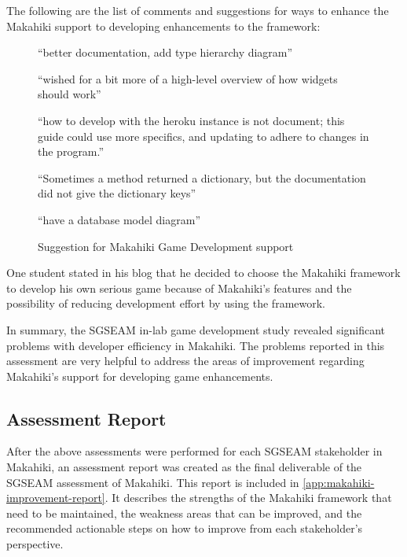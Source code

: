 The following are the list of comments and suggestions for ways to enhance the Makahiki support to developing enhancements to the framework:

\begin{figure}[ht!]
\begin{mybox}
\begin{compactenum}
	\item ``better documentation, add type hierarchy diagram''
	\item ``wished for a bit more of a high-level overview of how widgets should work''
	\item ``how to develop with the heroku instance is not document; this guide could use more specifics, and updating to adhere to changes in the program.''
	\item ``Sometimes a method returned a dictionary, but the documentation did not give the dictionary keys''
	\item ``have a database model diagram''
\end{compactenum}
\end{mybox}
\caption{Suggestion for Makahiki Game Development support}
\label{fig:develop-suggestion}  
\end{figure}

One student stated in his blog that he decided to choose the Makahiki
framework to develop his own serious game because of Makahiki's features and the possibility
of reducing development effort by using the framework. 

In summary, the SGSEAM in-lab game development study revealed significant problems with developer efficiency in Makahiki. The problems reported in this assessment are very helpful to address the areas of improvement regarding Makahiki's support for developing game enhancements.

\subsection{Assessment Report}

After the above assessments were performed for each SGSEAM stakeholder in Makahiki, an assessment report was created as the final deliverable of the SGSEAM assessment of Makahiki. This report is included in \autoref{app:makahiki-improvement-report}. It  describes the strengths of the Makahiki framework that need to be maintained, the weakness areas that can be improved, and the recommended actionable steps on how to improve from each stakeholder's perspective. 

